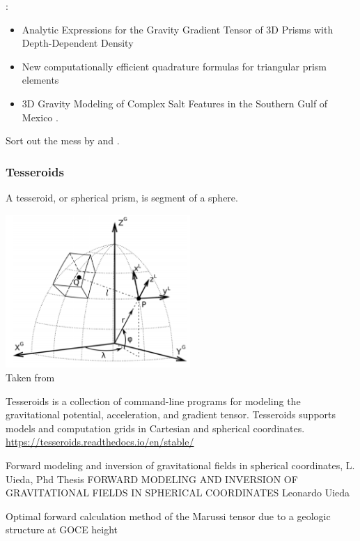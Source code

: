\Literature:
\begin{itemize}
\item Analytic Expressions for the Gravity Gradient Tensor
of 3D Prisms with Depth-Dependent Density \cite{jilz18}
\item New computationally efficient quadrature formulas for triangular
prism elements \cite{kuym13}
\item 3D Gravity Modeling of Complex Salt Features in the Southern
Gulf of Mexico \cite{naoo16}.
\end{itemize}

\bscthesis {} Sort out the mess by \cite{duti16} and \cite{zhhu17}.



\subsubsection{Tesseroids}

A tesseroid, or spherical prism, is segment of a sphere. 

\begin{center}
\includegraphics[width=7cm]{images/gravity/uibb11}\\
{\captionfont Taken from \cite{uibb11}}
\end{center}

Tesseroids is a collection of command-line programs for modeling the gravitational potential, 
acceleration, and gradient tensor. Tesseroids supports models and computation grids 
in Cartesian and spherical coordinates.
\url{https://tesseroids.readthedocs.io/en/stable/}



Forward modeling and inversion of gravitational fields in spherical coordinates, L. Uieda, Phd Thesis 
\cite{uied16}
FORWARD MODELING AND INVERSION OF GRAVITATIONAL FIELDS IN
SPHERICAL COORDINATES
Leonardo Uieda

Optimal forward calculation method of the Marussi tensor due to a geologic structure at GOCE height 
\cite{uibb11}


